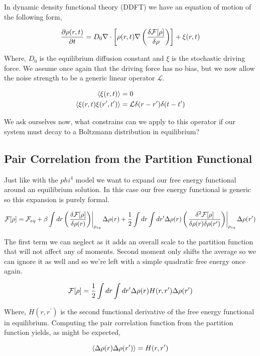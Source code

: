 In dynamic density functional theory (DDFT) we have an equation of motion of the following form,

\begin{equation}
	\frac{\partial \rho(r, t)}{\partial t} = D_0 \nabla \cdot \left[\rho(r,t)\nabla \left(\frac{\delta \mathcal{F}[\rho]}{\delta \rho}\right)\right] + \xi(r, t)
\end{equation}

Where, $D_0$ is the equilibrium diffusion constant and $\xi$ is the stochastic driving force. We assume once again that the driving force has no bias, but we now allow the noise strength to be a generic linear operator $\mathcal{L}$.

\begin{align}
	\langle \xi(r,t) \rangle &= 0 \\
	\left\langle \xi(r, t) \xi(r^\prime, t^\prime) \right\rangle &= \mathcal{L} \delta (r-r^\prime) \delta (t -t^\prime)
\end{align}

We ask ourselves now, what constrains can we apply to this operator if our system must decay to a Boltzmann distribution in equilibrium?

\subsection{Pair Correlation from the Partition Functional}

Just like with the $phi^4$ model we want to expand our free energy functional around an equilibrium solution. In this case our free energy functional is generic so this expansion is purely formal.

\begin{equation}
	\mathcal{F}[\rho] = \mathcal{F}_{eq} + \beta\int dr \left(\left.\frac{\delta \mathcal{F}[\rho]}{\delta \rho(r)}\right)\right\vert_{\rho_{eq}}\Delta\rho(r) + \frac{1}{2} \int dr \int dr^\prime \Delta\rho(r) \left(\left.\frac{\delta^2 \mathcal{F}[\rho]}{\delta \rho(r) \delta \rho(r^\prime)}\right)\right\vert_{\rho_{eq}} \Delta\rho(r^\prime)
\end{equation}

The first term we can neglect as it adds an overall scale to the partition function that will not affect any of moments. Second moment only shifts the average so we can ignore it as well and so we're left with a simple quadratic free energy once again.

\begin{equation}
	\mathcal{F}[\rho] = \frac{1}{2}\int dr \int dr^\prime \Delta \rho(r) H(r, r^\prime) \Delta \rho(r^\prime)
\end{equation}

Where, $H(r, r^\prime)$ is the second functional derivative of the free energy functional in equilibrium. Computing the pair correlation function from the partition function yields, as might be expected,

\begin{equation}
	\left\langle \Delta\rho(r) \Delta\rho(r^\prime) \right\rangle = H(r, r^\prime)
\end{equation}
